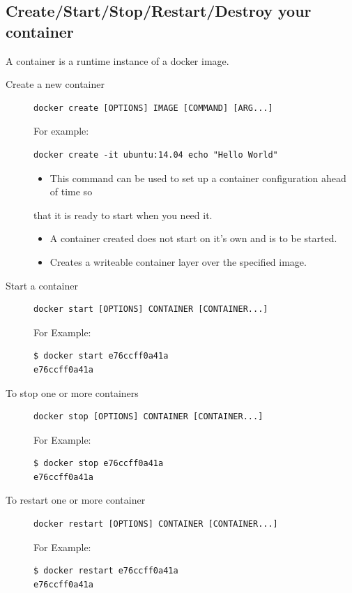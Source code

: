\documentclass[11pt]{article}
\begin{document}
\subsection{Create/Start/Stop/Restart/Destroy your container}
\label{sec:orgheadline9}
A container is a runtime instance of a docker image.
\begin{description}
\item[{Create a new container}] \begin{verbatim}
docker create [OPTIONS] IMAGE [COMMAND] [ARG...]
\end{verbatim}
For example:
\begin{verbatim}
docker create -it ubuntu:14.04 echo "Hello World"
\end{verbatim}
\begin{itemize}
\item This command can be used to set up a container configuration ahead of time so
\end{itemize}
that it is ready to start when you need it.
\begin{itemize}
\item A container created does not start on it's own and is to be started.
\item Creates a writeable container layer over the specified image.
\end{itemize}

\item[{Start a container}] \begin{verbatim}
docker start [OPTIONS] CONTAINER [CONTAINER...]
\end{verbatim}
For Example:
\begin{verbatim}
$ docker start e76ccff0a41a
e76ccff0a41a
\end{verbatim}
\item[{To stop one or more containers}] \begin{verbatim}
docker stop [OPTIONS] CONTAINER [CONTAINER...]
\end{verbatim}
For Example:
\begin{verbatim}
$ docker stop e76ccff0a41a
e76ccff0a41a
\end{verbatim}

\item[{To restart one or more container}] \begin{verbatim}
docker restart [OPTIONS] CONTAINER [CONTAINER...]
\end{verbatim}
For Example:
\begin{verbatim}
$ docker restart e76ccff0a41a
e76ccff0a41a
\end{verbatim}


\end{description}
\end{document}
